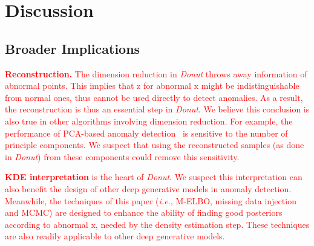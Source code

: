 \documentclass[sigconf]{acmart}
\newif\ifnotcompact\notcompactfalse
\newcommand\compactdel[1]{{\textcolor{red}{#1}}}
\newcommand\compactdel[1]{}
\newcommand\compactdel[1]{#1}
\newcommand{\DONUT}{\textit{Donut}}
\newcommand{\IE}{\textit{i.e.}}
\newcommand{\vv}[1]{\bm{\mathrm{{#1}}}}
\begin{document}



\ifnotcompact
\section{Discussion}
\label{sec:discussion}

\subsection{Broader Implications}
\label{sec:implication}

\compactdel{
\textbf{Reconstruction.} The dimension reduction in \DONUT{} throws away information of abnormal points.
This implies that $\vv{z}$ for abnormal $\vv{x}$ might be indistinguishable from normal ones, thus cannot be used directly to detect anomalies.
As a result, the reconstruction is thus an essential step in \DONUT{}.
We believe this conclusion is also true in other algorithms involving dimension reduction. For example, the performance of  PCA-based anomaly detection~\cite{pca_ad1,pca_ad2,sensitivity_pca} 
is sensitive to the number of principle components. We suspect that using the reconstructed samples (as done in \DONUT{}) from these components could remove this sensitivity.
}

\compactdel{
\textbf{KDE interpretation} is the heart of \DONUT{}.  We suspect this interpretation can also benefit the design of other deep generative models in anomaly detection.  Meanwhile, the techniques of this paper (\IE, M-ELBO, missing data injection and MCMC) are designed to enhance the ability of finding good posteriors according to abnormal $\vv{x}$, needed by the density estimation step.  These techniques are also readily applicable to other deep generative models.
}
\end{document}
